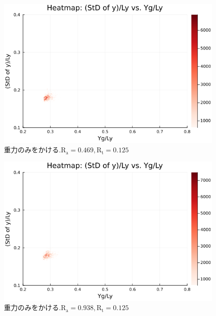 \begin{figure}[H]
  \centering
  \includegraphics[scale=0.6]{image/dT0_heat/2024-01-15T14:30:47.255_mapg0_chi0_Ay50_rho0.4_T0.43_dT0.0_Rd0.0_Rt0.125_Ra0.4693845_g0.0003999718779659611_run4.0e7.png}
  \caption{$重力のみをかける. \text{R}_\text{a}=0.469,\text{R}_\text{t}=0.125$}
  \label{}
\end{figure}

\begin{figure}[H]
  \centering
  \includegraphics[scale=0.6]{image/dT0_heat/2024-01-15T14:30:47.323_mapg0_chi0_Ay50_rho0.4_T0.43_dT0.0_Rd0.0_Rt0.125_Ra0.938769_g0.0003999718779659611_run4.0e7.png}
  \caption{$重力のみをかける. \text{R}_\text{a}=0.938,\text{R}_\text{t}=0.125$}
  \label{}
\end{figure}

